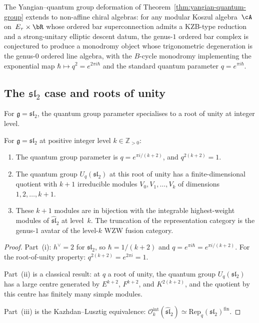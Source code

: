 \begin{conjecture}
\ClaimStatusConjectured
\label{conj:yangian-quantum-group-general}
The Yangian--quantum group deformation of
Theorem~\textup{\ref{thm:yangian-quantum-group}} extends to
non-affine chiral algebras: for any modular Koszul algebra~$\cA$
on~$E_\tau \times \bR$ whose ordered bar superconnection admits a
KZB-type reduction and a strong-unitary elliptic descent datum, the
genus-$1$ ordered bar complex is conjectured to produce a monodromy
object whose trigonometric degeneration is the genus-$0$ ordered line
algebra, with the $B$-cycle monodromy implementing the exponential map
$\hbar \mapsto q^2 = e^{2\pi i \hbar}$ and the standard quantum
parameter $q = e^{\pi i \hbar}$.
\end{conjecture}

\subsection{The $\mathfrak{sl}_2$ case and roots of unity}
\label{sec:sl2-roots-unity}

For $\mathfrak{g} = \mathfrak{sl}_2$, the quantum group parameter
specialises to a root of unity at integer level.

\begin{corollary}
\label{cor:sl2-root-of-unity}
For $\mathfrak{g} = \mathfrak{sl}_2$ at positive integer level
$k \in \mathbb{Z}_{>0}$:
\begin{enumerate}[label=\textup{(\roman*)}]
\item The quantum group parameter is
 $q = e^{\pi i/(k+2)}$, and
 $q^{2(k+2)} = 1$.
\item The quantum group $U_q(\mathfrak{sl}_2)$ at this root of
 unity has a finite-dimensional quotient with $k+1$ irreducible
 modules $V_0, V_1, \dots, V_k$ of dimensions $1, 2, \dots, k+1$.
\item These $k+1$ modules are in bijection with the integrable
 highest-weight modules of $\widehat{\mathfrak{sl}}_2$ at level~$k$.
 The truncation of the representation category is the genus-$1$
 avatar of the level-$k$ WZW fusion category.
\end{enumerate}
\end{corollary}

\begin{proof}
Part~(i): $h^\vee = 2$ for $\mathfrak{sl}_2$, so
$\hbar = 1/(k+2)$ and $q = e^{\pi i \hbar} = e^{\pi i/(k+2)}$.
For the root-of-unity property:
$q^{2(k+2)} = e^{2\pi i} = 1$.

Part~(ii) is a classical result: at $q$ a root of unity, the
quantum group $U_q(\mathfrak{sl}_2)$ has a large centre generated
by $E^{k+2}$, $F^{k+2}$, and $K^{2(k+2)}$, and the quotient by
this centre has finitely many simple modules.

Part~(iii) is the Kazhdan--Lusztig equivalence:
$\mathcal{O}_k^{\mathrm{int}}(\widehat{\mathfrak{sl}}_2)
\simeq \mathrm{Rep}_q(\mathfrak{sl}_2)^{\mathrm{fin}}$.
\end{proof}

